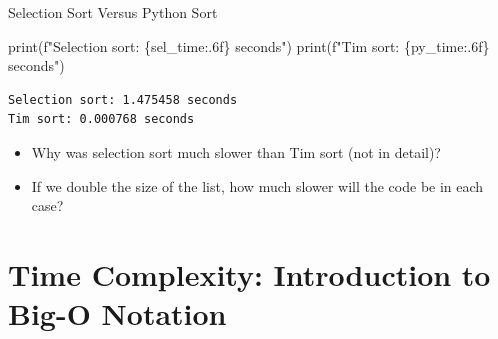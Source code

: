 \documentclass[
  ignorenonframetext,
]{beamer}
\newenvironment{Shaded}{\begin{snugshade}}{\end{snugshade}}
\newcommand{\BuiltInTok}[1]{\textcolor[rgb]{0.00,0.23,0.31}{#1}}
\newcommand{\NormalTok}[1]{\textcolor[rgb]{0.00,0.23,0.31}{#1}}
\newcommand{\SpecialCharTok}[1]{\textcolor[rgb]{0.37,0.37,0.37}{#1}}
\newcommand{\SpecialStringTok}[1]{\textcolor[rgb]{0.13,0.47,0.30}{#1}}
\begin{document}
\begin{frame}[fragile]{Selection Sort Versus Python Sort}
\protect\hypertarget{selection-sort-versus-python-sort-2}{}
\begin{Shaded}
\begin{Highlighting}[]
\BuiltInTok{print}\NormalTok{(}\SpecialStringTok{f"Selection sort: }\SpecialCharTok{\{}\NormalTok{sel\_time}\SpecialCharTok{:.6f\}}\SpecialStringTok{ seconds"}\NormalTok{)}
\BuiltInTok{print}\NormalTok{(}\SpecialStringTok{f"Tim sort: }\SpecialCharTok{\{}\NormalTok{py\_time}\SpecialCharTok{:.6f\}}\SpecialStringTok{ seconds"}\NormalTok{)}
\end{Highlighting}
\end{Shaded}

\begin{verbatim}
Selection sort: 1.475458 seconds
Tim sort: 0.000768 seconds
\end{verbatim}

\begin{itemize}
\item
  Why was selection sort much slower than Tim sort (not in detail)?
\item
  If we double the size of the list, how much slower will the code be in
  each case?
\end{itemize}
\end{frame}

\hypertarget{time-complexity-introduction-to-big-o-notation}{%
\section{Time Complexity: Introduction to Big-O
Notation}\label{time-complexity-introduction-to-big-o-notation}}
\end{document}
